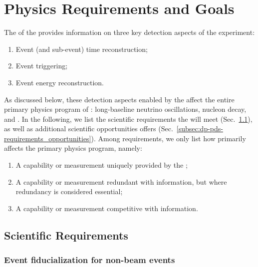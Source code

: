 \section{Physics Requirements and Goals}
\label{sec:dp-pds-requirements}

The  of the \dune {} provides information on three key detection aspects of the experiment:

\begin{enumerate}
\item Event (and sub-event) time reconstruction;
\item Event triggering;
\item Event energy reconstruction.
\end{enumerate}

As discussed below, these detection aspects enabled by the  affect the entire primary physics program of \dune: long-baseline neutrino oscillations, nucleon decay, and . In the following, we list the scientific requirements the  will meet  (Sec.~\ref{subsec:dp-pds-requirements_requirements}), as well as additional scientific opportunities  offers (Sec.~\ref{subsec:dp-pds-requirements_opportunities}). Among requirements, we only list how  primarily affects the \dune primary physics program, namely: 
\begin{enumerate}
\item A capability or measurement uniquely provided by the ;
\item A capability or measurement redundant with  information, but where redundancy is considered essential;
\item A capability or measurement competitive with  information.
\end{enumerate}


\subsection{Scientific Requirements}
\label{subsec:dp-pds-requirements_requirements}

\subsubsection{Event fiducialization for non-beam events}

